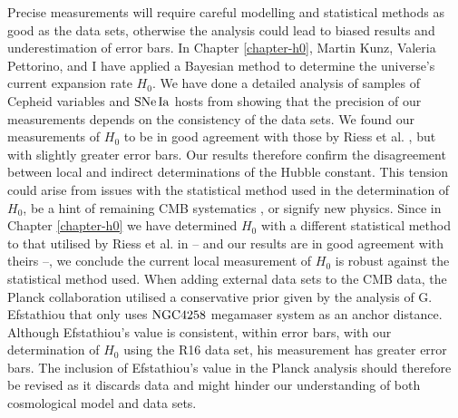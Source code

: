 Precise measurements will require careful modelling and statistical methods as good as the data sets, otherwise the analysis could lead to biased results and underestimation of error bars. In Chapter \ref{chapter-h0}, Martin Kunz, Valeria Pettorino, and I have applied a Bayesian method to determine the universe's current expansion rate $H_0$. We have done a detailed analysis of samples of Cepheid variables and $\mathrm{SNe\,Ia}$ hosts from \cite{Riess:2011yx,Riess:2016jrr} showing that the precision of our measurements depends on the consistency of the data sets. We found our measurements of $H_0$ to be in good agreement with those by Riess et al. \cite{Riess:2011yx,Riess:2016jrr}, but with slightly greater error bars. Our results therefore confirm the disagreement between local and indirect determinations of the Hubble constant. This tension could arise from issues with the statistical method used in the determination of $H_0$, be a hint of remaining CMB systematics \cite{Riess:2016jrr}, or signify new physics. Since in Chapter \ref{chapter-h0} we have determined $H_0$ with a different statistical method to that utilised by Riess et al. in \cite{Riess:2016jrr} -- and our results are in good agreement with theirs --, we conclude the current local measurement of $H_0$ is robust against the statistical method used. When adding external data sets to the CMB data, the Planck collaboration utilised a conservative prior given by the analysis of G. Efstathiou \cite{Efstathiou:2013via} that only uses $\mathrm{NGC4258}$ megamaser system as an anchor distance. Although Efstathiou's value is consistent, within error bars, with our determination of $H_0$ using the R16 data set, his measurement has greater error bars. The inclusion of Efstathiou's value in the Planck analysis should therefore be revised as it discards data and might hinder our understanding of both cosmological model and data sets.        


